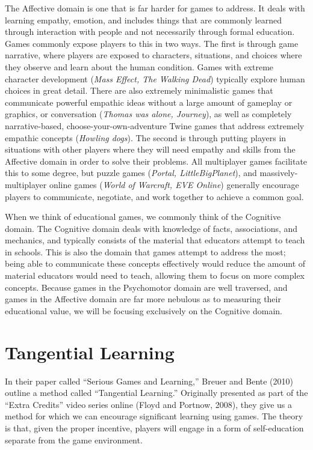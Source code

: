 \documentclass[12pt]{report}
\begin{document}
		The Affective domain is one that is far harder for games to address. It deals with learning empathy, emotion, and includes things that are commonly learned through interaction with people and not necessarily through formal education. Games commonly expose players to this in two ways. The first is through game narrative, where players are exposed to characters, situations, and choices where they observe and learn about the human condition. Games with extreme character development (\textit{Mass Effect, The Walking Dead}) typically explore human choices in great detail. There are also extremely minimalistic games that communicate powerful empathic ideas without a large amount of gameplay or graphics, or conversation (\textit{Thomas was alone, Journey}), as well as completely narrative-based, choose-your-own-adventure Twine games that address extremely empathic concepts (\textit{Howling dogs}). The second is through putting players in situations with other players where they will need empathy and skills from the Affective domain in order to solve their problems. All multiplayer games facilitate this to some degree, but puzzle games (\textit{Portal, LittleBigPlanet}), and massively-multiplayer online games (\textit{World of Warcraft, EVE Online}) generally encourage players to communicate, negotiate, and work together to achieve a common goal.

		When we think of educational games, we commonly think of the Cognitive domain. The Cognitive domain deals with knowledge of facts, associations, and mechanics, and typically consists of the material that educators attempt to teach in schools. This is also the domain that games attempt to address the most; being able to communicate these concepts effectively would reduce the amount of material educators would need to teach, allowing them to focus on more complex concepts. Because games in the Psychomotor domain are well traversed, and games in the Affective domain are far more nebulous as to measuring their educational value, we will be focusing exclusively on the Cognitive domain.

			

	\section{Tangential Learning}

		In their paper called “Serious Games and Learning,” Breuer and Bente (2010) outline a method called “Tangential Learning.” Originally presented as part of the “Extra Credits” video series online (Floyd and Portnow, 2008), they give us a method for which we can encourage significant learning using games. The theory is that, given the proper incentive, players will engage in a form of self-education separate from the game environment.
		
\end{document}
